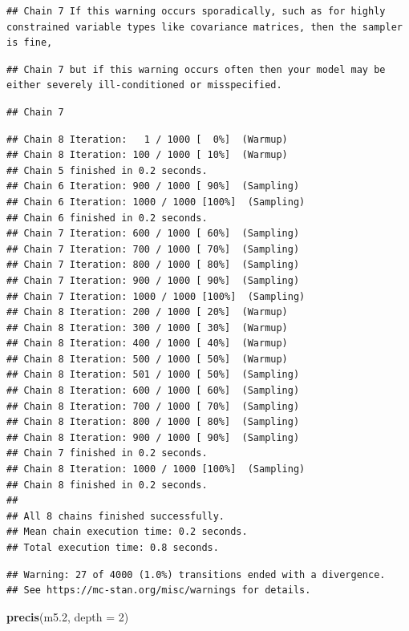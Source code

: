 \documentclass[
]{book}
\newenvironment{Shaded}{\begin{snugshade}}{\end{snugshade}}
\newcommand{\AttributeTok}[1]{\textcolor[rgb]{0.13,0.29,0.53}{#1}}
\newcommand{\DecValTok}[1]{\textcolor[rgb]{0.00,0.00,0.81}{#1}}
\newcommand{\FloatTok}[1]{\textcolor[rgb]{0.00,0.00,0.81}{#1}}
\newcommand{\FunctionTok}[1]{\textcolor[rgb]{0.13,0.29,0.53}{\textbf{#1}}}
\newcommand{\NormalTok}[1]{#1}
\begin{document}
\begin{verbatim}
## Chain 7 If this warning occurs sporadically, such as for highly constrained variable types like covariance matrices, then the sampler is fine,
\end{verbatim}

\begin{verbatim}
## Chain 7 but if this warning occurs often then your model may be either severely ill-conditioned or misspecified.
\end{verbatim}

\begin{verbatim}
## Chain 7
\end{verbatim}

\begin{verbatim}
## Chain 8 Iteration:   1 / 1000 [  0%]  (Warmup) 
## Chain 8 Iteration: 100 / 1000 [ 10%]  (Warmup) 
## Chain 5 finished in 0.2 seconds.
## Chain 6 Iteration: 900 / 1000 [ 90%]  (Sampling) 
## Chain 6 Iteration: 1000 / 1000 [100%]  (Sampling) 
## Chain 6 finished in 0.2 seconds.
## Chain 7 Iteration: 600 / 1000 [ 60%]  (Sampling) 
## Chain 7 Iteration: 700 / 1000 [ 70%]  (Sampling) 
## Chain 7 Iteration: 800 / 1000 [ 80%]  (Sampling) 
## Chain 7 Iteration: 900 / 1000 [ 90%]  (Sampling) 
## Chain 7 Iteration: 1000 / 1000 [100%]  (Sampling) 
## Chain 8 Iteration: 200 / 1000 [ 20%]  (Warmup) 
## Chain 8 Iteration: 300 / 1000 [ 30%]  (Warmup) 
## Chain 8 Iteration: 400 / 1000 [ 40%]  (Warmup) 
## Chain 8 Iteration: 500 / 1000 [ 50%]  (Warmup) 
## Chain 8 Iteration: 501 / 1000 [ 50%]  (Sampling) 
## Chain 8 Iteration: 600 / 1000 [ 60%]  (Sampling) 
## Chain 8 Iteration: 700 / 1000 [ 70%]  (Sampling) 
## Chain 8 Iteration: 800 / 1000 [ 80%]  (Sampling) 
## Chain 8 Iteration: 900 / 1000 [ 90%]  (Sampling) 
## Chain 7 finished in 0.2 seconds.
## Chain 8 Iteration: 1000 / 1000 [100%]  (Sampling) 
## Chain 8 finished in 0.2 seconds.
## 
## All 8 chains finished successfully.
## Mean chain execution time: 0.2 seconds.
## Total execution time: 0.8 seconds.
\end{verbatim}

\begin{verbatim}
## Warning: 27 of 4000 (1.0%) transitions ended with a divergence.
## See https://mc-stan.org/misc/warnings for details.
\end{verbatim}

\begin{Shaded}
\begin{Highlighting}[]
\FunctionTok{precis}\NormalTok{(m5}\FloatTok{.2}\NormalTok{, }\AttributeTok{depth =} \DecValTok{2}\NormalTok{)}
\end{Highlighting}
\end{Shaded}
\end{document}
